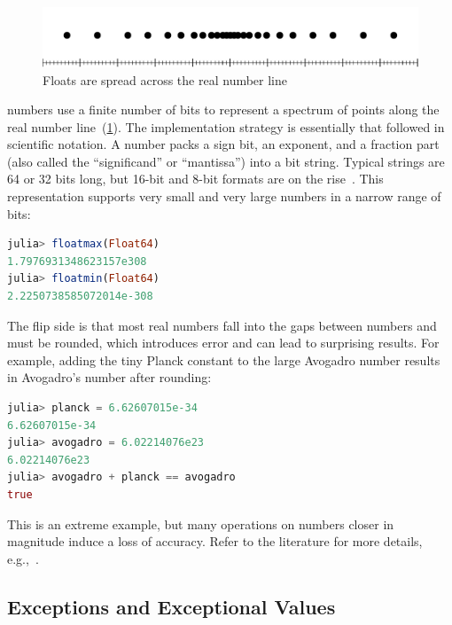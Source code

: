\documentclass{juliacon}
\begin{document}
\begin{figure}[t]\centering
  \includegraphics[trim=10 0 10 0,clip,width=0.95\columnwidth]{fig/real_vs_fp.pdf}
  \caption{Floats are spread across the real number line}
  \label{f:real-vs-fp}
\end{figure}

\Fp{} numbers use a finite number of bits to represent a spectrum of points along the real number line~(\cref{f:real-vs-fp}).
The implementation strategy is essentially that followed in scientific notation.
A \fp{} number packs a sign bit, an exponent, and a fraction part (also called the ``significand'' or ``mantissa'') into a bit string.
Typical strings are 64 or 32 bits long, but 16-bit and 8-bit formats are on the rise~\cite{klowerLowprecisionClimateComputing2021,fp8,p3109}.
This representation supports very small and very large numbers in a narrow range of bits:

\begin{lstlisting}[language = Julia]
julia> floatmax(Float64)
1.7976931348623157e308
julia> floatmin(Float64)
2.2250738585072014e-308
\end{lstlisting}

The flip side is that most real numbers fall into the gaps between \fp{} numbers and must be rounded, which introduces error
and can lead to surprising results.
For example, adding the tiny Planck constant to the large Avogadro number results
in Avogadro's number after rounding:

\begin{lstlisting}[language = Julia]
julia> planck = 6.62607015e-34
6.62607015e-34
julia> avogadro = 6.02214076e23
6.02214076e23
julia> avogadro + planck == avogadro
true
\end{lstlisting}

This is an extreme example, but many operations on \fp{} numbers closer in magnitude induce a loss of accuracy.
Refer to the literature for more details, e.g.,~\cite{knuthArtComputerProgramming1997,torontoPracticallyAccurateFloatingPoint2014,mullerHandbookFloatingPointArithmetic2018}.


\subsection{Exceptions and Exceptional Values}
\label{s:exnvalue}
\end{document}
